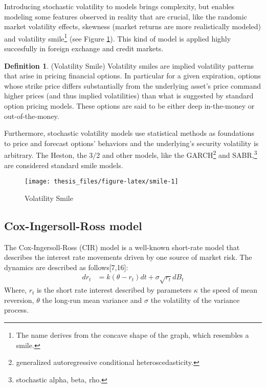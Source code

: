 \documentclass[12pt,twoside]{reedthesis}
\theoremstyle{definition}
\newtheorem{definition}{Definition}[section]
\theoremstyle{definition}
\theoremstyle{remark}
\begin{document}
  Introducing stochastic volatility to models brings complexity, but
  enables modeling some features observed in reality that are crucial,
  like the randomic market volatility effects, skewness (market returns
  are more realistically modeled) and volatility smile\footnote{The name
    derives from the concave shape of the graph, which resembles a smile.}
  (see Figure \ref{fig:smile}). This kind of model is applied highly
  succesfully in foreign exchange and credit markets.
  \begin{definition}{(Volatility Smile)} 
  Volatility smiles are implied volatility patterns that arise in pricing financial options. In particular for a given expiration, options whose strike price differs substantially from the underlying asset's price command higher prices (and thus implied volatilities) than what is suggested by standard option pricing models. These options are said to be either deep in-the-money or out-of-the-money.
  \end{definition}
  Furthermore, stochastic volatility models use statistical methods as
  foundations to price and forecast options' behaviors and the
  underlying's security volatility is arbitrary. The Heston, the \(3/2\)
  and other models, like the GARCH\footnote{generalized autoregressive
    conditional heteroscedasticity.} and SABR,\footnote{stochastic alpha,
    beta, rho.} are considered standard smile models.
  \begin{figure}
  
  {\centering \texttt{[image: thesis\_files/figure-latex/smile-1]} 
  
  }
  
  \caption{Volatility Smile \label{smile}}\label{fig:smile}
  \end{figure}
  \subsection{Cox-Ingersoll-Ross model}\label{cir}
  
  The Cox-Ingersoll-Ross (CIR) model is a well-known short-rate model that
  describes the interest rate movements driven by one source of market
  risk. The dynamics are described as follows{[}7,16{]}:
  \begin{align}
  \label{eq:cir}
  dr_t &= k(\theta - r_t)dt + \sigma \sqrt{r_t} dB_t
  \end{align}
  \noindent
  Where, \(r_t\) is the short rate interest described by parameters
  \(\kappa\) the speed of mean reversion, \(\theta\) the long-run mean
  variance and \(\sigma\) the volatility of the variance process.
  
\end{document}
